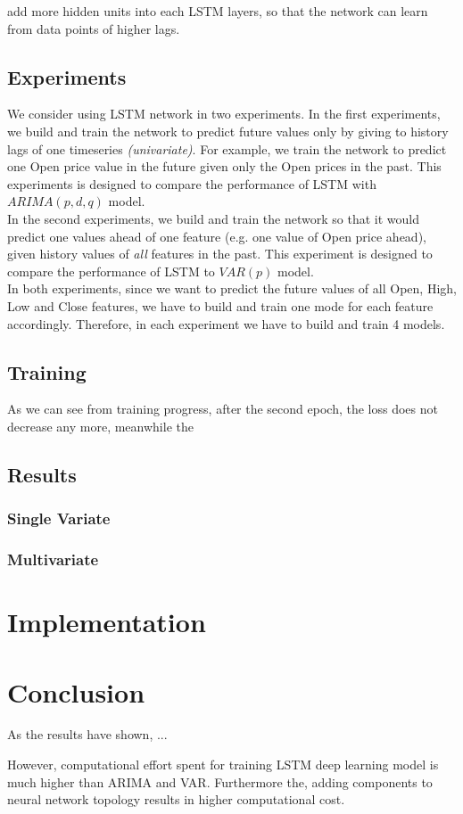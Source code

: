 \documentclass[11pt]{article}
\begin{document}
add more hidden units into each LSTM layers, so that the network can learn from
data points of higher lags.

\subsection{Experiments}
We consider using LSTM network in two experiments. In the first experiments, we
build and train the network to predict future values only by giving to history
lags of one timeseries \textit{(univariate)}. For example, we train the network to
predict one Open price value in the future given only the Open prices in the
past. This experiments is designed to compare the performance of LSTM with
$ARIMA(p, d, q)$ model.\\ 
In the second experiments, we build and train the network so that it would
predict one values ahead of one feature (e.g. one value of Open price ahead),
given history values of \textit{all} features in the past. This experiment is
designed to compare the performance of LSTM to $VAR(p)$ model.\\
In both experiments, since we want to predict the future values of all Open,
High, Low and Close features, we have to build and train one mode for each
feature accordingly. Therefore, in each experiment we have to build and train 4
models.

\subsection{Training}
As we can see from training progress, after the second epoch, the loss does not decrease any more, meanwhile the
\subsection{Results}

\subsubsection{Single Variate}

\subsubsection{Multivariate}

\section{Implementation}

\section{Conclusion}
As the results have shown, ...

However, computational effort spent for training LSTM deep learning model is
much higher than ARIMA and VAR. Furthermore the, adding components to neural network
topology results in higher computational cost. 

\pagebreak


\end{document}
